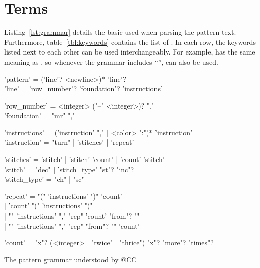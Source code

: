 \documentclass[main.tex]{subfiles}
\begin{document}
\section{Terms}\label{sec:terms}

Listing~\ref{lst:grammar} details the basic  used when parsing the pattern text.
Furthermore, table~\ref{tbl:keywords} contains the list of .
In each row, the keywords listed next to each other can be used inter\-changeably.
For example,  has the same meaning as , so whenever the grammar includes ``'',  can also be used.

\begin{listing}[htbp]
    \begin{tcolorbox}[parbox = false, colback = black!5, colframe = black!30]
    \begin{bnf}
    \setlength{\parskip}{8pt} %

    'pattern' = ('line'? <newline>)* 'line'? \\
    'line' = 'row_number'? 'foundation'? 'instructions'

    'row_number' = <integer> ("--" <integer>)? "." \\
    'foundation' = "mr" ","

    'instructions' = ('instruction' "," | <color> ":")* 'instruction' \\
    'instruction' = "turn" | 'stitches' | 'repeat'

    'stitches' = 'stitch' | 'stitch' 'count' | 'count' 'stitch' \\
    'stitch' = "dec" | 'stitch_type' "st"? "inc"? \\
    'stitch_type' = "ch" | "sc"

    'repeat' = "(" 'instructions' ")" 'count' \\
    \phantom{}\hspace{4em}| 'count' "(" 'instructions' ")" \\
    \phantom{}\hspace{4em}| "\*" 'instructions' "," "rep" 'count' "from"? "\*" \\
    \phantom{}\hspace{4em}| "\*" 'instructions' "," "rep" "from"? "\*" 'count'

    'count' = "x"? (<integer> | "twice" | "thrice") "x"? "more"? "times"?
    \end{bnf}
    \end{tcolorbox}
    \caption{The pattern grammar understood by @CC}
    \label{lst:grammar}
\end{listing}
\end{document}
